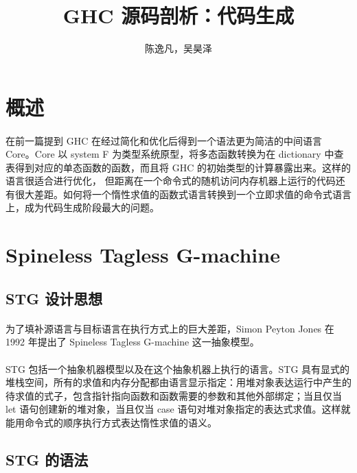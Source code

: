 \documentclass{article}
\author{陈逸凡，吴昊泽}
\title{GHC 源码剖析：代码生成}
\begin{document}
	\maketitle
	\section{概述}
	\paragraph{}
	在前一篇提到 GHC 在经过简化和优化后得到一个语法更为简洁的中间语言 Core。Core 以 system F 为类型系统原型，将多态函数转换为在 dictionary 中查表得到对应的单态函数的函数，而且将 GHC 的初始类型的计算暴露出来。这样的语言很适合进行优化， 但距离在一个命令式的随机访问内存机器上运行的代码还有很大差距。如何将一个惰性求值的函数式语言转换到一个立即求值的命令式语言上，成为代码生成阶段最大的问题。
	\section{Spineless Tagless G-machine}
	\subsection{STG 设计思想}
	\paragraph{}
	为了填补源语言与目标语言在执行方式上的巨大差距，Simon Peyton Jones 在 1992 年提出了 Spineless Tagless G-machine 这一抽象模型\cite{implementing-lazy-functional-languages-on-stock-hardware-the-spineless-tagless-g-machine}。
	\paragraph{}
	STG 包括一个抽象机器模型以及在这个抽象机器上执行的语言。STG 具有显式的堆栈空间，所有的求值和内存分配都由语言显示指定：用堆对象表达运行中产生的待求值的式子，包含指针指向函数和函数需要的参数和其他外部绑定；当且仅当 let 语句创建新的堆对象，当且仅当 case 语句对堆对象指定的表达式求值。这样就能用命令式的顺序执行方式表达惰性求值的语义。
	\subsection{STG 的语法}
\end{document}
